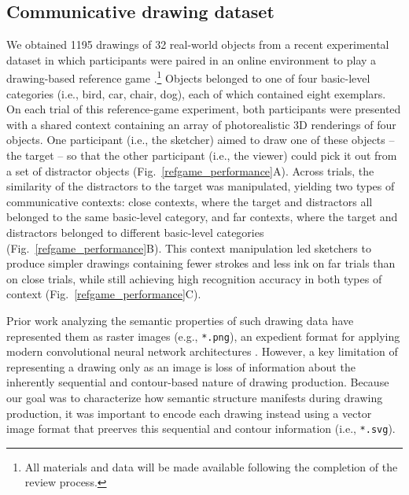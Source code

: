 \documentclass[10pt,letterpaper]{article}
\begin{document}
\subsection{Communicative drawing dataset}
We obtained 1195 drawings of 32 real-world objects from a recent experimental dataset in which participants were paired in an online environment to play a drawing-based reference game \cite{fan2018modeling}.\footnote{All materials and data will be made available following the completion of the review process.}
Objects belonged to one of four basic-level categories (i.e., bird, car, chair, dog), each of which contained eight exemplars. %
On each trial of this reference-game experiment, both participants were presented with a shared context containing an array of photorealistic 3D renderings of four objects.   
One participant (i.e., the sketcher) aimed to draw one of these objects -- the target -- so that the other participant (i.e., the viewer) could pick it out from a set of distractor objects (Fig.~\ref{refgame_performance}A). 
Across trials, the similarity of the distractors to the target was manipulated, yielding two types of communicative contexts: close contexts, where the target and distractors all belonged to the same basic-level category, and far contexts, where the target and distractors belonged to different basic-level categories (Fig.~\ref{refgame_performance}B). 
This context manipulation led sketchers to produce simpler drawings containing fewer strokes and less ink on far trials than on close trials, while still achieving high recognition accuracy in both types of context (Fig.~\ref{refgame_performance}C). %
 


Prior work analyzing the semantic properties of such drawing data have represented them as raster images (e.g., \texttt{*.png}), an expedient format for applying modern convolutional neural network architectures \cite{FanCommon2018,sangkloy2016sketchy,yu2017sketch}. 
However, a key limitation of representing a drawing only as an image is loss of information about the inherently sequential and contour-based nature of drawing production. 
Because our goal was to characterize how semantic structure manifests during drawing production, it was important to encode each drawing instead using a vector image format that preerves this sequential and contour information (i.e., \texttt{*.svg}). 
\end{document}
